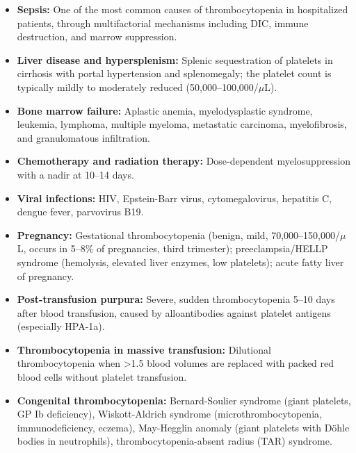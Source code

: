 \begin{itemize}
  \item \textbf{Sepsis:} One of the most common causes of thrombocytopenia in hospitalized patients, through multifactorial mechanisms including DIC, immune destruction, and marrow suppression.
  \item \textbf{Liver disease and hypersplenism:} Splenic sequestration of platelets in cirrhosis with portal hypertension and splenomegaly; the platelet count is typically mildly to moderately reduced (50,000--100,000/$\mu$L).
  \item \textbf{Bone marrow failure:} Aplastic anemia, myelodysplastic syndrome, leukemia, lymphoma, multiple myeloma, metastatic carcinoma, myelofibrosis, and granulomatous infiltration.
  \item \textbf{Chemotherapy and radiation therapy:} Dose-dependent myelosuppression with a nadir at 10--14 days.
  \item \textbf{Viral infections:} HIV, Epstein-Barr virus, cytomegalovirus, hepatitis C, dengue fever, parvovirus B19.
  \item \textbf{Pregnancy:} Gestational thrombocytopenia (benign, mild, 70,000--150,000/$\mu$L, occurs in 5--8\% of pregnancies, third trimester); preeclampsia/HELLP syndrome (hemolysis, elevated liver enzymes, low platelets); acute fatty liver of pregnancy.
  \item \textbf{Post-transfusion purpura:} Severe, sudden thrombocytopenia 5--10 days after blood transfusion, caused by alloantibodies against platelet antigens (especially HPA-1a).
  \item \textbf{Thrombocytopenia in massive transfusion:} Dilutional thrombocytopenia when >1.5 blood volumes are replaced with packed red blood cells without platelet transfusion.
  \item \textbf{Congenital thrombocytopenia:} Bernard-Soulier syndrome (giant platelets, GP Ib deficiency), Wiskott-Aldrich syndrome (microthrombocytopenia, immunodeficiency, eczema), May-Hegglin anomaly (giant platelets with D\"{o}hle bodies in neutrophils), thrombocytopenia-absent radius (TAR) syndrome.
\end{itemize}

